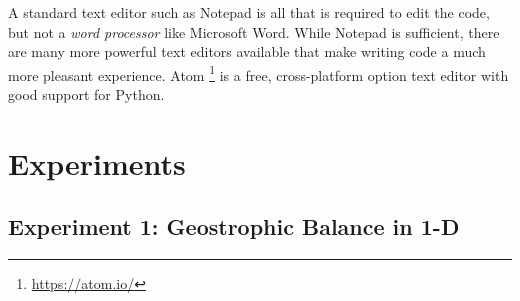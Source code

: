 \documentclass[a4paper, sfsidenotes, twoside]{tufte-handout}
\begin{document}
  A standard text editor such as Notepad is all that is required to edit the code, but not a \emph{word processor} like Microsoft Word.
  While Notepad is sufficient, there are many more powerful text editors available that make writing code a much more pleasant experience.
  Atom  \footnote{\url{https://atom.io/}} is a free, cross-platform option text editor with good support for Python.

  \section{Experiments}
  \label{sec:Experiments}

  \subsection{Experiment 1: Geostrophic Balance in 1-D}
  \label{sub:exp1}

\end{document}
